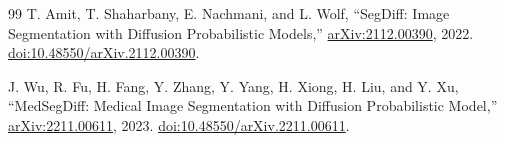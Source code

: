 \documentclass[11pt,a4paper]{article}
\begin{document}
\begin{thebibliography}{99}
T. Amit, T. Shaharbany, E. Nachmani, and L. Wolf,
``SegDiff: Image Segmentation with Diffusion Probabilistic Models,''
\href{https://arxiv.org/abs/2112.00390}{arXiv:2112.00390}, 2022. \href{https://doi.org/10.48550/arXiv.2112.00390}{doi:10.48550/arXiv.2112.00390}.

J. Wu, R. Fu, H. Fang, Y. Zhang, Y. Yang, H. Xiong, H. Liu, and Y. Xu,
``MedSegDiff: Medical Image Segmentation with Diffusion Probabilistic Model,''
\href{https://arxiv.org/abs/2211.00611}{arXiv:2211.00611}, 2023. \href{https://doi.org/10.48550/arXiv.2211.00611}{doi:10.48550/arXiv.2211.00611}.

\end{thebibliography}
\end{document}
